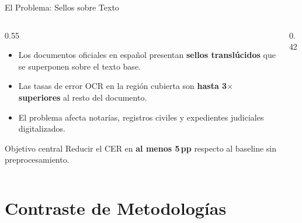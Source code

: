 \documentclass[aspectratio=169, 11pt]{beamer}
\newcommand{\rojo}[1]{\textcolor{PriRed}{#1}}
\begin{document}
\begin{frame}{El Problema: Sellos sobre Texto}
  \begin{columns}[T]
    \begin{column}{0.55\textwidth}
      \begin{itemize}[leftmargin=1.2em, itemsep=8pt]
        \item Los documentos oficiales en español presentan
              \rojo{\textbf{sellos translúcidos}} que se superponen
              sobre el texto base.
        \item Las tasas de error OCR en la región cubierta son
              \rojo{\textbf{hasta 3$\times$ superiores}} al resto del documento.
        \item El problema afecta notarías, registros civiles y
              expedientes judiciales digitalizados.
      \end{itemize}
      \vspace{8pt}
      \begin{exampleblock}{Objetivo central}
        Reducir el CER en \textbf{al menos 5\,pp} respecto al
        baseline sin preprocesamiento.
      \end{exampleblock}
    \end{column}
    \begin{column}{0.42\textwidth}
      \centering
    \end{column}
  \end{columns}
\end{frame}

\section{Contraste de Metodologías}
\end{document}
